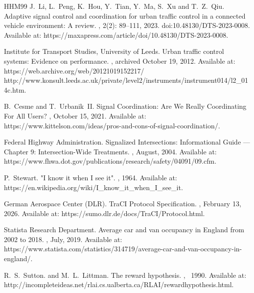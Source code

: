 \documentclass[a4paper]{report}
\begin{document}
\begin{thebibliography}{HHM99}
J.~Li, L.~Peng, K.~Hou, Y.~Tian, Y.~Ma, S.~Xu and T.~Z.~Qiu.
\newblock Adaptive signal control and coordination for urban traffic control in a connected vehicle environment: A review.
, 2(2): 89--111, 2023.
\newblock doi:10.48130/DTS-2023-0008.
\newblock Available at:
  https://maxapress.com/article/doi/10.48130/DTS-2023-0008.

Institute for Transport Studies, University of Leeds.
\newblock Urban traffic control systems: Evidence on performance.
, archived October 19, 2012.
\newblock Available at:
  https://web.archive.org/web/20121019152217/
  http://www.konsult.leeds.ac.uk/private/level2/instruments/instrument014/l2\_014c.htm.

B.~Cesme and T.~Urbanik~II.
\newblock Signal Coordination: Are We Really Coordinating For All Users?
, October 15, 2021.
\newblock Available at:
  https://www.kittelson.com/ideas/pros-and-cons-of-signal-coordination/.

Federal Highway Administration.
\newblock Signalized Intersections: Informational Guide — Chapter 9: Intersection-Wide Treatments.
, August, 2004.
\newblock Available at:
  https://www.fhwa.dot.gov/publications/research/safety/04091/09.cfm.

P.~Stewart.
\newblock "I know it when I see it".
, 1964.
\newblock Available at:
  https://en.wikipedia.org/wiki/I\_know\_it\_when\_I\_see\_it.

German Aerospace Center (DLR).
\newblock TraCI Protocol Specification.
, February 13, 2026.
\newblock Available at:
  https://sumo.dlr.de/docs/TraCI/Protocol.html.

Statista Research Department.
\newblock Average car and van occupancy in England from 2002 to 2018.
, July, 2019.
\newblock Available at:
  https://www.statista.com/statistics/314719/average-car-and-van-occupancy-in-england/.

R.~S.~Sutton. and M.~L.~Littman.
\newblock The reward hypothesis.
, ~1990.
\newblock Available at:
  http://incompleteideas.net/rlai.cs.ualberta.ca/RLAI/rewardhypothesis.html.


\end{thebibliography}
\end{document}
